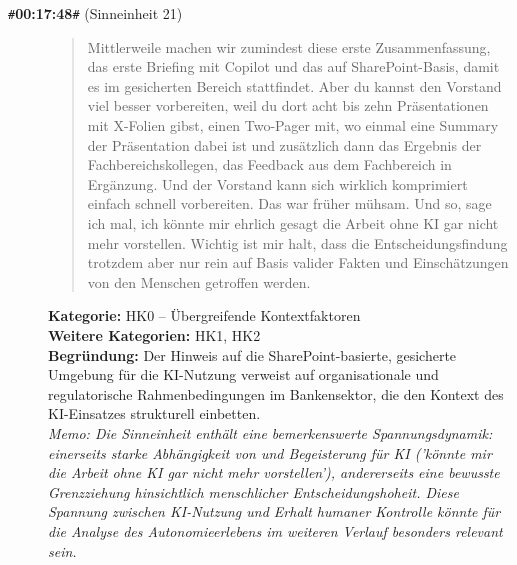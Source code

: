\begin{description}
  \item[\texttt{\#}\textbf{00:17:48}\texttt{\#} (Sinneinheit 21)]
  \begin{quote}
  Mittlerweile machen wir zumindest diese erste Zusammenfassung, das erste Briefing mit Copilot und das auf SharePoint-Basis, damit es im gesicherten Bereich stattfindet. Aber du kannst den Vorstand viel besser vorbereiten, weil du dort acht bis zehn Präsentationen mit X-Folien gibst, einen Two-Pager mit, wo einmal eine Summary der Präsentation dabei ist und zusätzlich dann das Ergebnis der Fachbereichskollegen, das Feedback aus dem Fachbereich in Ergänzung. Und der Vorstand kann sich wirklich komprimiert einfach schnell vorbereiten. Das war früher mühsam. Und so, sage ich mal, ich könnte mir ehrlich gesagt die Arbeit ohne KI gar nicht mehr vorstellen. Wichtig ist mir halt, dass die Entscheidungsfindung trotzdem aber nur rein auf Basis valider Fakten und Einschätzungen von den Menschen getroffen werden.
  \end{quote}
  \textbf{Kategorie:} HK0 -- Übergreifende Kontextfaktoren\\
  \textbf{Weitere Kategorien:} HK1, HK2\\
  \textbf{Begr\"undung:} Der Hinweis auf die SharePoint-basierte, gesicherte Umgebung für die KI-Nutzung verweist auf organisationale und regulatorische Rahmenbedingungen im Bankensektor, die den Kontext des KI-Einsatzes strukturell einbetten.
  \\\textit{Memo: Die Sinneinheit enthält eine bemerkenswerte Spannungsdynamik: einerseits starke Abhängigkeit von und Begeisterung für KI ('könnte mir die Arbeit ohne KI gar nicht mehr vorstellen'), andererseits eine bewusste Grenzziehung hinsichtlich menschlicher Entscheidungshoheit. Diese Spannung zwischen KI-Nutzung und Erhalt humaner Kontrolle könnte für die Analyse des Autonomieerlebens im weiteren Verlauf besonders relevant sein.}
\end{description}
\medskip

